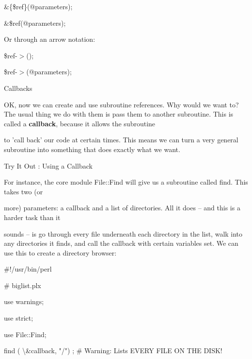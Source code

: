 \documentclass[a4paper,11pt]{book}
\begin{document}
\noindent \&\{\$ref\}(@parameters);

\noindent \&\$ref(@parameters);

\noindent 

\noindent 

\noindent Or through an arrow notation:

\noindent 

\noindent 

\noindent \$ref-$>$();

\noindent \$ref-$>$(@parameters);

\noindent 

\noindent 

\noindent Callbacks

\noindent 

\noindent OK, now we can create and use subroutine references. Why would we want to? The usual thing we do with them is pass them to another subroutine. This is called a \textbf{callback}, because it allows the subroutine

\noindent to 'call back' our code at certain times. This means we can turn a very general subroutine into something that does exactly what we want.

\noindent 

\noindent Try It Out : Using a Callback

\noindent 

\noindent 

\noindent For instance, the core module File::Find will give us a subroutine called find. This takes two (or

\noindent more) parameters: a callback and a list of directories. All it does -- and this is a harder task than it

\noindent sounds -- is go through every file underneath each directory in the list, walk into any directories it finds, and call the callback with certain variables set. We can use this to create a directory browser:

\noindent 

\noindent 

\noindent \#!/usr/bin/perl

\noindent \# biglist.plx

\noindent use warnings;

\noindent use strict;

\noindent use File::Find;

\noindent find ( \textbackslash \&callback, "/") ; \# Warning: Lists EVERY FILE ON THE DISK!
\end{document}
